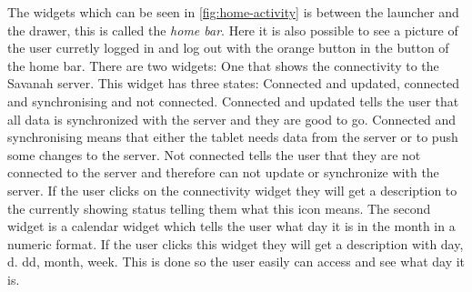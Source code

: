 The widgets which can be seen in \autoref{fig:home-activity} is between the launcher and the drawer, this is called the \textit{home bar}. Here it is also possible to see a picture of the user curretly logged in and log out with the orange button in the button of the home bar. There are two widgets: One that shows the connectivity to the Savanah server. This widget has three states: Connected and updated, connected and synchronising and not connected. Connected and updated tells the user that all data is synchronized with the server and they are good to go. Connected and synchronising means that either the tablet needs data from the server or to push some changes to the server. Not connected tells the user that they are not connected to the server and therefore can not update or synchronize with the server. 
If the user clicks on the connectivity widget they will get a description to the currently showing status telling them what this icon means.
The second widget is a calendar widget which tells the user what day it is in the month in a numeric format. If the user clicks this widget they will get a description with day, d. dd, month, week. This is done so the user easily can access and see what day it is.


\begin{lstlisting}[style=sourceCode, language=JAVA, caption=This is code, label=lst:homeActivity] 

\end{lstlisting}